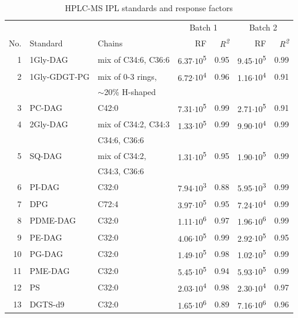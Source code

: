 \begin{table}
\centering
\begin{threeparttable}
  \caption{HPLC-MS IPL standards and response factors}
 
\begin{tabular}{rllrrrr}
\toprule
      &       &       & \multicolumn{2}{c}{Batch 1\tnote{b}} & \multicolumn{2}{c}{Batch 2\tnote{c}} \\
\cmidrule(l{2pt}r{2pt}){4-5} \cmidrule(l{2pt}r{2pt}){6-7}No.\tnote{a} & Standard & Chains & RF    & \textit{R\textsuperscript{2}} & RF    & \textit{R\textsuperscript{2}} \\
\midrule
1     & 1Gly-DAG & mix of C34:6, C36:6 & 6.37$\cdot 10$\textsuperscript{5} & 0.95  & 9.45$\cdot 10$\textsuperscript{5} & 0.99 \\
2     & 1Gly-GDGT-PG & mix of 0-3 rings, & 6.72$\cdot 10$\textsuperscript{4} & 0.96  & 1.16$\cdot 10$\textsuperscript{4} & 0.91 \\
      &       & $\sim$20\% H-shaped &       &       &       &  \\
3     & PC-DAG & C42:0 & 7.31$\cdot 10$\textsuperscript{5} & 0.99  & 2.71$\cdot 10$\textsuperscript{5} & 0.91 \\
4     & 2Gly-DAG & mix of C34:2, C34:3 & 1.33$\cdot 10$\textsuperscript{5} & 0.99  & 9.90$\cdot 10$\textsuperscript{4} & 0.99 \\
      &       & C34:6, C36:6 &       &       &       &  \\
5     & SQ-DAG & mix of C34:2,  & 1.31$\cdot 10$\textsuperscript{5} & 0.95  & 1.90$\cdot 10$\textsuperscript{5} & 0.99 \\
      &       & C34:3, C36:6 &       &       &       &  \\
6     & PI-DAG & C32:0 & 7.94$\cdot 10$\textsuperscript{3} & 0.88  & 5.95$\cdot 10$\textsuperscript{3} & 0.99 \\
7     & DPG   & C72:4 & 3.97$\cdot 10$\textsuperscript{5} & 0.95  & 7.24$\cdot 10$\textsuperscript{4} & 0.99 \\
8     & PDME-DAG & C32:0 & 1.11$\cdot 10$\textsuperscript{6} & 0.97  & 1.96$\cdot 10$\textsuperscript{6} & 0.99 \\
9     & PE-DAG & C32:0 & 4.06$\cdot 10$\textsuperscript{5} & 0.99  & 2.92$\cdot 10$\textsuperscript{5} & 0.95 \\
10    & PG-DAG & C32:0 & 1.49$\cdot 10$\textsuperscript{5} & 0.98  & 1.02$\cdot 10$\textsuperscript{5} & 0.99 \\
11    & PME-DAG & C32:0 & 5.45$\cdot 10$\textsuperscript{5} & 0.94  & 5.93$\cdot 10$\textsuperscript{5} & 0.99 \\
12    & PS    & C32:0 & 2.03$\cdot 10$\textsuperscript{4} & 0.98  & 2.30$\cdot 10$\textsuperscript{4} & 0.97 \\
13    & DGTS-d9 & C32:0 & 1.65$\cdot 10$\textsuperscript{6} & 0.89  & 7.16$\cdot 10$\textsuperscript{6} & 0.96 \\
\bottomrule
\end{tabular}%




\end{threeparttable}
\end{table}
